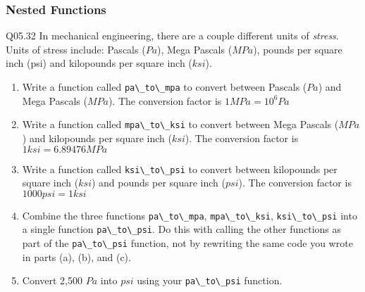 \documentclass{book}
\newenvironment{problems}{}{}  %
\newcommand{\passthrough}[1]{#1}
\begin{document}
    
        \begin{problems}
        \hypertarget{nested-functions}{%
\subsubsection{Nested Functions}\label{nested-functions}}

Q05.32 In mechanical engineering, there are a couple different units of
\emph{stress}. Units of stress include: Pascals (\(Pa\)), Mega Pascals
(\(MPa\)), pounds per square inch (psi) and kilopounds per square inch
(\(ksi\)).

\begin{enumerate}
\def\labelenumi{(\alph{enumi})}
\item
  Write a function called \passthrough{\lstinline!pa\_to\_mpa!} to
  convert between Pascals (\(Pa\)) and Mega Pascals (\(MPa\)). The
  conversion factor is \(1 MPa = 10^6 Pa\)
\item
  Write a function called \passthrough{\lstinline!mpa\_to\_ksi!} to
  convert between Mega Pascals (\(MPa\)) and kilopounds per square inch
  (\(ksi\)). The conversion factor is \(1 ksi = 6.89476 MPa\)
\item
  Write a function called \passthrough{\lstinline!ksi\_to\_psi!} to
  convert between kilopounds per square inch (\(ksi\)) and pounds per
  square inch (\(psi\)). The conversion factor is \(1000 psi = 1 ksi\)
\item
  Combine the three functions \passthrough{\lstinline!pa\_to\_mpa!},
  \passthrough{\lstinline!mpa\_to\_ksi!},
  \passthrough{\lstinline!ksi\_to\_psi!} into a single function
  \passthrough{\lstinline!pa\_to\_psi!}. Do this with calling the other
  functions as part of the \passthrough{\lstinline!pa\_to\_psi!}
  function, not by rewriting the same code you wrote in parts (a), (b),
  and (c).
\item
  Convert 2,500 \(Pa\) into \(psi\) using your
  \passthrough{\lstinline!pa\_to\_psi!} function.
\end{enumerate}
        \end{problems}

    
\end{document}
